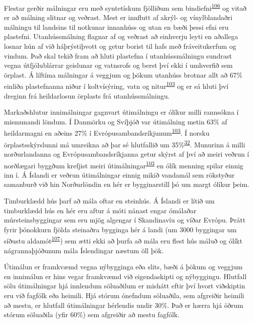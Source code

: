 \documentclass[icelandic,]{book}
\begin{document}
Flestar gerðir málningar eru með syntetískum fjölliðum sem bindiefni\textsuperscript{\protect\hyperlink{ref-Durkin2018}{106}} og vitað er að málning slitnar og veðrast. Mest er innflutt af akrýl- og vínylblandaðri málningu til landsins til notkunar innanhúss og utan en bæði þessi efni eru plastefni. Utanhússmálning flagnar af og veðrast að einhverju leyti en aðallega losnar hún af við háþrýstiþvott og getur borist til hafs með fráveitukerfum og vindum. Það skal tekið fram að hluti plastefna í utanhússmálningu sundrast vegna útfjólublárrar geislunar og vatnsrofs og berst því ekki í umhverfið sem örplast. Á líftíma málningar á veggjum og þökum utanhúss brotnar allt að 67\% einliða plastefnanna niður í koltvísýring, vatn og nitur\textsuperscript{\protect\hyperlink{ref-Hann2018}{103}} og er sá hluti því dreginn frá heildarlosun örplasts frá utanhússmálningu.

Markaðshlutur innimálningar gagnvart útimálningu er ólíkur milli rannsókna í mismunandi löndum. Í Danmörku og Svíþjóð var útimálning metin 63\% af heildarmagni en aðeins 27\% í Evrópusambandsríkjunum\textsuperscript{\protect\hyperlink{ref-Hann2018}{103}}. Í norsku örplastsskýrslunni má umreikna að þar sé hlutfallið um 35\%\textsuperscript{\protect\hyperlink{ref-sundt2014sources}{32}}. Munurinn á milli norðurlandanna og Evrópusambandsríkjanna getur skýrst af því að meiri veðrun í norðlægari byggðum krefjist meiri útimálningar\textsuperscript{\protect\hyperlink{ref-Hann2018}{103}} en ólík menning spilar einnig inn í. Á Íslandi er veðrun útimálningar einnig mikið vandamál sem rökstyður samanburð við hin Norðurlöndin en hér er bygginarstíll þó um margt ólíkur þeim.

Timburklædd hús þarf að mála oftar en steinhús. Á Íslandi er lítið um timburklædd hús en hér eru aftur á móti nánast engar ómálaðar múrsteinsbyggingar sem eru mjög algengar í Skandinavíu og víðar Evrópu. Þrátt fyrir þónokkurn fjölda steinaðra bygginga hér á landi (um 3000 byggingar um síðustu aldamót\textsuperscript{\protect\hyperlink{ref-Guuxf0mundsson2003}{107}}) sem ætti ekki að þurfa að mála eru flest hús máluð og ólíkt nágrannaþjóðunum mála Íslendingar næstum öll þök.

Útimálun er framkvæmd vegna nýbygginga eða slits, bæði á þökum og veggjum en innimálun er hins vegar framkvæmd við eigendaskipti og nýbyggingu. Hlutfall sölu útimálningar hjá innlendum söluaðilum er mishátt eftir því hvort viðskiptin eru við fagfólk eða heimili. Hjá stórum ónefndum söluaðila, sem afgreiðir heimili að mestu, er hlutfall útimálningar hérlendis undir 30\%. Það er hærra hjá öðrum stórum söluaðila (yfir 60\%) sem afgreiðir að mestu fagfólk.
\end{document}
